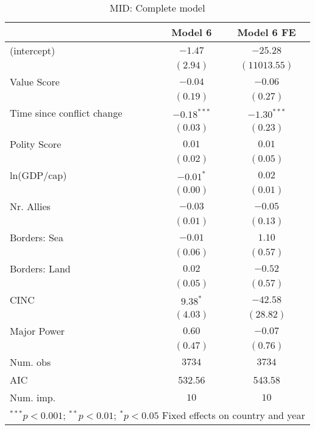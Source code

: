 
\begin{table}
\begin{center}
\begin{tabular}{l c c}
\toprule
 & Model 6 & Model 6 FE \\
\midrule
(intercept)                & $-1.47$       & $-25.28$      \\
                           & $(2.94)$      & $(11013.55)$  \\
Value Score                & $-0.04$       & $-0.06$       \\
                           & $(0.19)$      & $(0.27)$      \\
Time since conflict change & $-0.18^{***}$ & $-1.30^{***}$ \\
                           & $(0.03)$      & $(0.23)$      \\
Polity Score               & $0.01$        & $0.01$        \\
                           & $(0.02)$      & $(0.05)$      \\
ln(GDP/cap)                & $-0.01^{*}$   & $0.02$        \\
                           & $(0.00)$      & $(0.01)$      \\
Nr. Allies                 & $-0.03$       & $-0.05$       \\
                           & $(0.01)$      & $(0.13)$      \\
Borders: Sea               & $-0.01$       & $1.10$        \\
                           & $(0.06)$      & $(0.57)$      \\
Borders: Land              & $0.02$        & $-0.52$       \\
                           & $(0.05)$      & $(0.57)$      \\
CINC                       & $9.38^{*}$    & $-42.58$      \\
                           & $(4.03)$      & $(28.82)$     \\
Major Power                & $0.60$        & $-0.07$       \\
                           & $(0.47)$      & $(0.76)$      \\
\midrule
Num. obs                   & $3734$        & $3734$        \\
AIC                        & 532.56        & 543.58        \\
Num. imp.                  & $10$          & $10$          \\
\bottomrule
\multicolumn{3}{l}{\scriptsize{$^{***}p<0.001$; $^{**}p<0.01$; $^{*}p<0.05$ 
 Fixed effects on country and year}}
\end{tabular}
\caption{MID: Complete model}
\label{MID_3}
\end{center}
\end{table}
